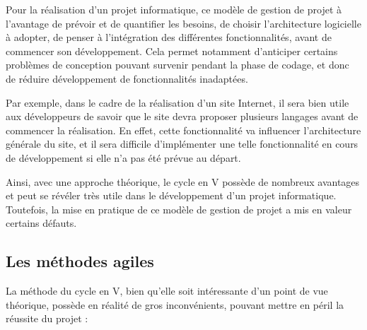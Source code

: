 Pour la réalisation d'un projet informatique, ce modèle de gestion de projet à l'avantage de prévoir et de quantifier les besoins, de choisir l'architecture logicielle à adopter, de penser à l'intégration des différentes fonctionnalités, avant de commencer son développement. Cela permet notamment d'anticiper certains problèmes de conception pouvant survenir pendant la phase de codage, et donc de réduire développement de fonctionnalités inadaptées.

Par exemple, dans le cadre de la réalisation d'un site Internet, il sera bien utile aux développeurs de savoir que le site devra proposer plusieurs langages avant de commencer la réalisation. En effet, cette fonctionnalité va influencer l'architecture générale du site, et il sera difficile d'implémenter une telle fonctionnalité en cours de développement si elle n'a pas été prévue au départ.

Ainsi, avec une approche théorique, le cycle en V possède de nombreux avantages et peut se révéler très utile dans le développement d'un projet informatique. Toutefois, la mise en pratique de ce modèle de gestion de projet a mis en valeur certains défauts.

\subsection{Les méthodes agiles}

La méthode du cycle en V, bien qu'elle soit intéressante d'un point de vue théorique, possède en réalité de gros inconvénients, pouvant mettre en péril la réussite du projet :

